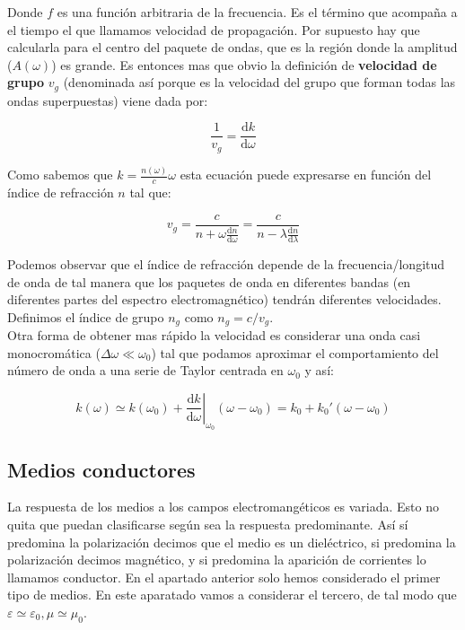 \documentclass[12pt,a4paper]{article}
\newcommand{\D}{\mathrm{d}}
\numberwithin{equation}{section}
\numberwithin{figure}{section}
\begin{document}
Donde $f$ es una función arbitraria de la frecuencia. Es el término que acompaña a el tiempo el que llamamos velocidad de propagación. Por supuesto hay que calcularla para el centro del paquete de ondas, que es la región donde la amplitud ($A(\omega)$) es grande. Es entonces mas que obvio la definición de \textbf{velocidad de grupo} $v_g$ (denominada así porque es la velocidad del grupo que forman todas las ondas superpuestas) viene dada por:

\begin{equation}
\dfrac{1}{v_g} = \dfrac{\D k}{\D \omega}
\end{equation}

Como sabemos que $k = \frac{n(\omega)}{c} \omega$ esta ecuación puede expresarse en función del índice de refracción $n$ tal que:

\begin{equation}
v_g = \dfrac{c}{n+\omega \frac{\D n}{\D \omega}} = \dfrac{c}{n - \lambda \frac{\D n}{\D \lambda}}
\end{equation}

Podemos observar que el índice de refracción depende de la frecuencia/longitud de onda de tal manera que los paquetes de onda en diferentes bandas (en diferentes partes del espectro electromagnético) tendrán diferentes velocidades. Definimos el índice de grupo $n_g$ como $n_g = c / v_g$. \\


Otra forma de obtener mas rápido la velocidad es considerar una onda casi monocromática ($\Delta \omega \ll \omega_0$) tal que podamos aproximar el comportamiento del número de onda a una serie de Taylor centrada en $\omega_0$ y así:

\begin{equation}
k(\omega) \simeq k(\omega_0) +  \left. \dfrac{\D k}{\D \omega} \right|_{\omega_0} (\omega-\omega_0) = k_0 + k_0' (\omega - \omega_0)
\end{equation} 

\subsection{Medios conductores}

La respuesta de los medios a los campos electromangéticos es variada. Esto no quita que puedan clasificarse según sea la respuesta predominante. Así sí predomina la polarización decimos que el medio es un dieléctrico, si predomina la polarización decimos magnético, y si predomina la aparición de corrientes lo llamamos conductor. En el apartado anterior solo hemos considerado el primer tipo de medios. En este aparatado vamos a considerar el tercero, de tal modo que $\varepsilon \simeq \varepsilon_0, \mu \simeq \mu_0$.
\end{document}
